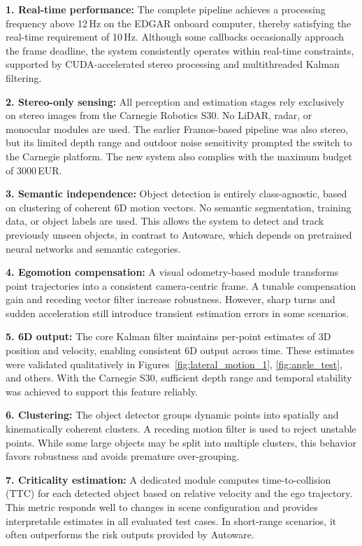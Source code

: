 \textbf{1. Real-time performance:} The complete pipeline achieves a processing
frequency above 12\,Hz on the EDGAR onboard computer, thereby satisfying the
real-time requirement of 10\,Hz. Although some callbacks occasionally approach
the frame deadline, the system consistently operates within real-time
constraints, supported by CUDA-accelerated stereo processing and multithreaded
Kalman filtering.


\textbf{2. Stereo-only sensing:} All perception and estimation stages rely
exclusively on stereo images from the Carnegie Robotics S30. No LiDAR, radar,
or monocular modules are used. The earlier Framos-based pipeline was also stereo,
but its limited depth range and outdoor noise sensitivity prompted the switch
to the Carnegie platform. The new system also complies with the maximum budget of 
3000\,EUR.

\textbf{3. Semantic independence:} Object detection is entirely class-agnostic,
based on clustering of coherent 6D motion vectors. No semantic segmentation,
training data, or object labels are used. This allows the system to detect and
track previously unseen objects, in contrast to Autoware, which depends on
pretrained neural networks and semantic categories.

\textbf{4. Egomotion compensation:} A visual odometry-based module transforms
point trajectories into a consistent camera-centric frame. A tunable compensation
gain and receding vector filter increase robustness. However, sharp turns and
sudden acceleration still introduce transient estimation errors in some
scenarios.

\textbf{5. 6D output:} The core Kalman filter maintains per-point estimates of
3D position and velocity, enabling consistent 6D output across time. These
estimates were validated qualitatively in Figures~\ref{fig:lateral_motion_1},
\ref{fig:angle_test}, and others. With the Carnegie S30, sufficient depth
range and temporal stability was achieved to support this feature reliably.

\textbf{6. Clustering:} The object detector groups dynamic points into spatially
and kinematically coherent clusters. A receding motion filter is used to reject
unstable points. While some large objects may be split into multiple clusters,
this behavior favors robustness and avoids premature over-grouping.

\textbf{7. Criticality estimation:} A dedicated module computes time-to-collision
(TTC) for each detected object based on relative velocity and the ego trajectory.
This metric responds well to changes in scene configuration and provides
interpretable estimates in all evaluated test cases. In short-range scenarios,
it often outperforms the risk outputs provided by Autoware.

